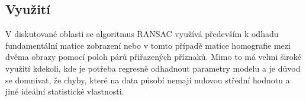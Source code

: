 	\subsection{Využití}
		V diskutované oblasti se algoritmus RANSAC využívá především k odhadu fundamentální matice zobrazení nebo v tomto případě matice homografie mezi dvěma obrazy pomocí poloh párů přiřazených příznaků. Mimo to má velmi široké využití kdekoli, kde je potřeba regresně odhadnout parametry modelu a je důvod se domnívat, že chyby, které na data působí nemají nulovou střední hodnotu a jiné ideální statistické vlastnosti.
	